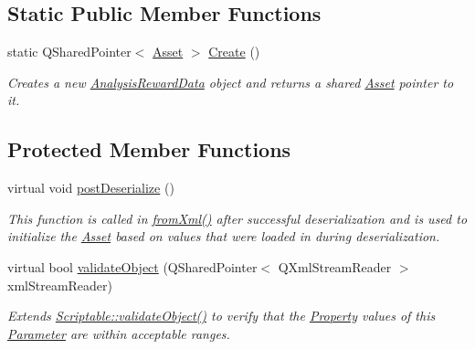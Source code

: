\subsection*{Static Public Member Functions}
\begin{DoxyCompactItemize}
\item 
\hypertarget{class_picto_1_1_analysis_reward_data_ad3d108b5c356204dce25eb2290812379}{static Q\-Shared\-Pointer$<$ \hyperlink{class_picto_1_1_asset}{Asset} $>$ \hyperlink{class_picto_1_1_analysis_reward_data_ad3d108b5c356204dce25eb2290812379}{Create} ()}\label{class_picto_1_1_analysis_reward_data_ad3d108b5c356204dce25eb2290812379}

\begin{DoxyCompactList}\small\item\em Creates a new \hyperlink{class_picto_1_1_analysis_reward_data}{Analysis\-Reward\-Data} object and returns a shared \hyperlink{class_picto_1_1_asset}{Asset} pointer to it. \end{DoxyCompactList}\end{DoxyCompactItemize}
\subsection*{Protected Member Functions}
\begin{DoxyCompactItemize}
\item 
virtual void \hyperlink{class_picto_1_1_analysis_reward_data_ad2054bf00b94fe3449dd46ce2c9245b2}{post\-Deserialize} ()
\begin{DoxyCompactList}\small\item\em This function is called in \hyperlink{class_picto_1_1_asset_a8bed4da09ecb1c07ce0dab313a9aba67}{from\-Xml()} after successful deserialization and is used to initialize the \hyperlink{class_picto_1_1_asset}{Asset} based on values that were loaded in during deserialization. \end{DoxyCompactList}\item 
virtual bool \hyperlink{class_picto_1_1_analysis_reward_data_a04595898ba52980c6f48755178c546ee}{validate\-Object} (Q\-Shared\-Pointer$<$ Q\-Xml\-Stream\-Reader $>$ xml\-Stream\-Reader)
\begin{DoxyCompactList}\small\item\em Extends \hyperlink{class_picto_1_1_scriptable_ab6e2944c43a3b5d418bf7b251594386d}{Scriptable\-::validate\-Object()} to verify that the \hyperlink{class_picto_1_1_property}{Property} values of this \hyperlink{class_picto_1_1_parameter}{Parameter} are within acceptable ranges. \end{DoxyCompactList}\end{DoxyCompactItemize}
